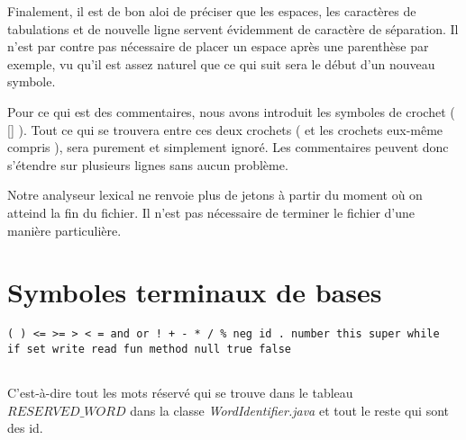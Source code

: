 Finalement, il est de bon aloi de préciser que les espaces, les caractères de tabulations et de nouvelle ligne servent évidemment de caractère de séparation. Il n'est par contre pas nécessaire de placer un espace après une parenthèse par exemple, vu qu'il est assez naturel que ce qui suit sera le début d'un nouveau symbole.

Pour ce qui est des commentaires, nous avons introduit les symboles de crochet ( [] ). Tout ce qui se trouvera entre ces deux crochets ( et les crochets eux-même compris ), sera purement et simplement ignoré. Les commentaires peuvent donc s'étendre sur plusieurs lignes sans aucun problème.

Notre analyseur lexical ne renvoie plus de jetons à partir du moment où on atteind la fin du fichier. Il n'est pas nécessaire de terminer le fichier d'une manière particulière.

\section{Symboles terminaux de bases}
\begin{verbatim}
( ) <= >= > < = and or ! + - * / % neg id . number this super while 
if set write read fun method null true false 
 
\end{verbatim}
C'est-à-dire tout les mots réservé qui se trouve dans le tableau $RESERVED\_WORD$ dans la classe \textit{WordIdentifier.java} et tout le reste qui sont
des id.

